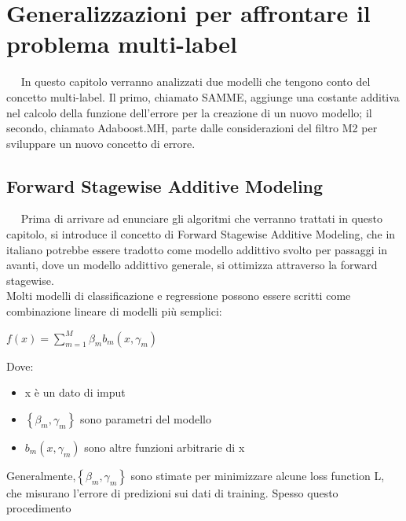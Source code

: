 \chapter{Generalizzazioni per affrontare il problema multi-label}
\ \
\newline
In questo capitolo verranno analizzati due modelli che tengono conto del concetto multi-label. Il primo, chiamato 
SAMME, aggiunge una costante additiva nel calcolo della funzione dell'errore per la 
creazione di un nuovo modello; il secondo, chiamato Adaboost.MH, parte dalle considerazioni del filtro M2 
per sviluppare un nuovo concetto di errore. 
\section{Forward Stagewise Additive Modeling}
\ \
\newline
Prima di arrivare ad enunciare gli algoritmi che verranno trattati in questo capitolo, si introduce il concetto 
di Forward Stagewise Additive Modeling, che in italiano potrebbe essere tradotto come modello addittivo svolto per 
passaggi in avanti, dove un modello addittivo generale, si ottimizza attraverso la forward stagewise.\\
\newline
Molti modelli di classificazione e regressione possono essere scritti come combinazione lineare di modelli 
pi\`u semplici:
\begin{center}
 \begin{math}
  f(x)=\sum_{m=1}^M \beta_m b_m (x,\gamma_m)
 \end{math}
\end{center}
Dove:
\begin{itemize}
 \item x \`e un dato di imput
 \item \begin{math}
        \left\{ \beta_m,\gamma_m\right\}
       \end{math} sono parametri del modello
 \item \begin{math}
         b_m(x,\gamma_m)
       \end{math} sono altre funzioni arbitrarie di x

\end{itemize}
Generalmente,\begin{math} \left\{ \beta_m,\gamma_m\right\}\end{math} sono stimate per minimizzare alcune
loss function L, che misurano l'errore di predizioni sui dati di training. Spesso questo procedimento 
